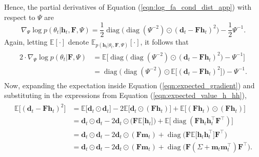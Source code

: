 \documentclass[msc,deptreport.inf]{infthesis} %
\newcommand{\matr}[1]{\mathbf{#1}}
\newcommand{\E}{\mathbb E}
\newcommand{\diag}{\mathop{\mathrm{diag}}}
\begin{document}
Hence, the partial derivatives of Equation (\ref{eqn:log_fa_cond_dist_app}) with respect to $\Psi$ are
\begin{equation}
	\nabla_{\Psi} \log p(\theta_t | \matr{h}_t, \matr{F}, \Psi)
	= \frac{1}{2} \diag\big(\diag(\Psi^{-2}) \odot (\matr{d}_t - \matr{Fh}_t)^2\big) - \frac{1}{2}\Psi^{-1}.
\end{equation}
Again, letting $\E[\cdot]$ denote $\E_{p(\matr{h}_t | \theta_t, \matr{F}, \Psi)}[\cdot]$, it follows that
\begin{align}\label{eqn:expected_gradient}
\begin{split}
	2 \cdot \nabla_{\Psi} \log p(\theta_t | \matr{F}, \Psi) 
	& = \E \big[ \diag\big(\diag(\Psi^{-2}) \odot (\matr{d}_t - \matr{Fh}_t)^2\big) - \Psi^{-1} \big] \\
	& = \diag\Big(\diag(\Psi^{-2}) \odot \E \big[(\matr{d}_t - \matr{Fh}_t)^2\big]\Big) - \Psi^{-1}.
\end{split}
\end{align} 
Now, expanding the expectation inside Equation (\ref{eqn:expected_gradient}) and substituting in the expressions from Equation (\ref{eqn:expected_value_h_hh}),
\begin{align}\label{eqn:expected_gradient_d_Fh}
\begin{split}
	\E \big[(\matr{d}_t - \matr{Fh}_t)^2\big] 
	& = \E \big[\matr{d}_t \odot \matr{d}_t \big] - 2\E \big[ \matr{d}_t \odot (\matr{Fh}_t) \big] + \E \big[ (\matr{Fh}_t) \odot (\matr{Fh}_t) \big] \\
	& = \matr{d}_t \odot \matr{d}_t - 2\matr{d}_t \odot \big(\matr{F} \E \big[ \matr{h}_t \big]\big) + \E \big[ \diag(\matr{F}\matr{h}_t \matr{h}_t^\intercal  \matr{F}^\intercal) \big] \\
	& = \matr{d}_t \odot \matr{d}_t - 2\matr{d}_t \odot (\matr{F} \matr{m}_t) + \diag\big( \matr{F} \E \big[ \matr{h}_t \matr{h}_t^\intercal \big] \matr{F}^\intercal \big) \\
	& = \matr{d}_t \odot \matr{d}_t - 2\matr{d}_t \odot (\matr{F} \matr{m}_t) + \diag\big( \matr{F} (\Sigma + \matr{m}_t \matr{m}_t^\intercal) \matr{F}^\intercal \big).
\end{split}
\end{align} 
\end{document}
